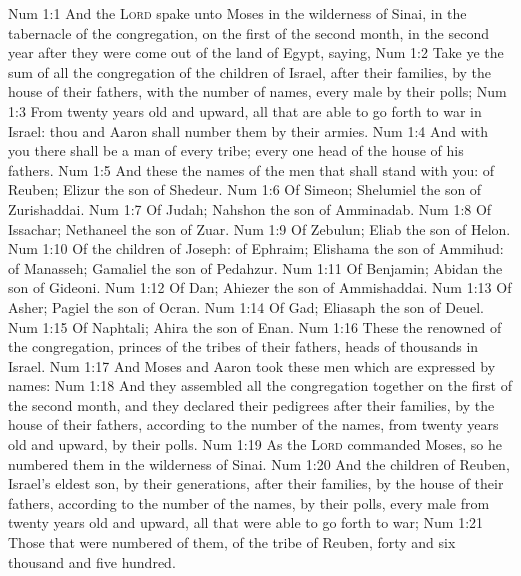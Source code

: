 \vs Num 1:1 And the \textsc{Lord} spake unto Moses in the wilderness of Sinai, in the tabernacle of the congregation, on the first  of the second month, in the second year after they were come out of the land of Egypt, saying,
\vs Num 1:2 Take ye the sum of all the congregation of the children of Israel, after their families, by the house of their fathers, with the number of  names, every male by their polls;
\vs Num 1:3 From twenty years old and upward, all that are able to go forth to war in Israel: thou and Aaron shall number them by their armies.
\vs Num 1:4 And with you there shall be a man of every tribe; every one head of the house of his fathers.
\vs Num 1:5 And these  the names of the men that shall stand with you: of  Reuben; Elizur the son of Shedeur.
\vs Num 1:6 Of Simeon; Shelumiel the son of Zurishaddai.
\vs Num 1:7 Of Judah; Nahshon the son of Amminadab.
\vs Num 1:8 Of Issachar; Nethaneel the son of Zuar.
\vs Num 1:9 Of Zebulun; Eliab the son of Helon.
\vs Num 1:10 Of the children of Joseph: of Ephraim; Elishama the son of Ammihud: of Manasseh; Gamaliel the son of Pedahzur.
\vs Num 1:11 Of Benjamin; Abidan the son of Gideoni.
\vs Num 1:12 Of Dan; Ahiezer the son of Ammishaddai.
\vs Num 1:13 Of Asher; Pagiel the son of Ocran.
\vs Num 1:14 Of Gad; Eliasaph the son of Deuel.
\vs Num 1:15 Of Naphtali; Ahira the son of Enan.
\vs Num 1:16 These  the renowned of the congregation, princes of the tribes of their fathers, heads of thousands in Israel.
\vs Num 1:17 And Moses and Aaron took these men which are expressed by  names:
\vs Num 1:18 And they assembled all the congregation together on the first  of the second month, and they declared their pedigrees after their families, by the house of their fathers, according to the number of the names, from twenty years old and upward, by their polls.
\vs Num 1:19 As the \textsc{Lord} commanded Moses, so he numbered them in the wilderness of Sinai.
\vs Num 1:20 And the children of Reuben, Israel's eldest son, by their generations, after their families, by the house of their fathers, according to the number of the names, by their polls, every male from twenty years old and upward, all that were able to go forth to war;
\vs Num 1:21 Those that were numbered of them,  of the tribe of Reuben,  forty and six thousand and five hundred.
